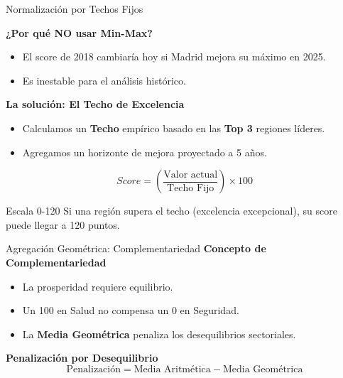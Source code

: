 \documentclass[10pt, aspectratio=169]{beamer}
\begin{document}
\begin{frame}{Normalización por Techos Fijos}
    
    \textbf{¿Por qué NO usar Min-Max?}
    \begin{itemize}
        \item El score de 2018 cambiaría hoy si Madrid mejora su máximo en 2025.
        \item Es inestable para el análisis histórico.
    \end{itemize}

    \vspace{0.4cm} %

    \textbf{La solución: El Techo de Excelencia}
    \begin{itemize}
        \item Calculamos un \textbf{Techo} empírico basado en las \textbf{Top 3} regiones líderes.
        \item Agregamos un horizonte de mejora proyectado a 5 años.
    \end{itemize}

    \vspace{0.3cm}

    \[ Score = \left( \frac{\text{Valor actual}}{\text{Techo Fijo}} \right) \times 100 \]

    \vspace{0.4cm}

    \begin{exampleblock}{Escala 0-120}
        Si una región supera el techo (excelencia excepcional), su score puede llegar a 120 puntos.
    \end{exampleblock}

\end{frame}

\begin{frame}{Agregación Geométrica: Complementariedad}
    \textbf{Concepto de Complementariedad}
    \begin{itemize}
        \item La prosperidad requiere equilibrio.
        \item Un 100 en Salud no compensa un 0 en Seguridad.
        \item La \textbf{Media Geométrica} penaliza los desequilibrios sectoriales.
    \end{itemize}
    \vspace{0.4cm}
    \textbf{Penalización por Desequilibrio}
    \[ \text{Penalización} = \text{Media Aritmética} - \text{Media Geométrica} \]
\end{frame}
\end{document}
